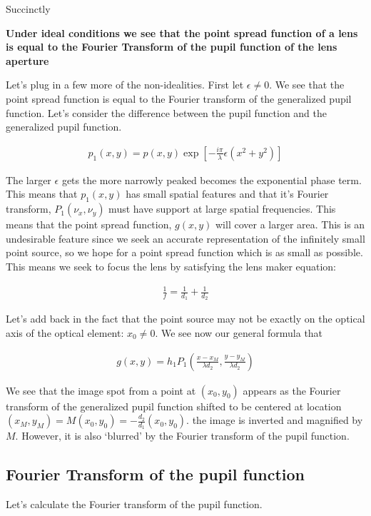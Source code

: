 \documentclass[12pt]{article}
\begin{document}
Succinctly

\textbf{Under ideal conditions we see that the point spread function of a lens is equal to the Fourier Transform of the pupil function of the lens aperture}


Let's plug in a few more of the non-idealities. First let $\epsilon \neq 0$.
We see that the point spread function is equal to the Fourier transform of the generalized pupil function. Let's consider the difference between the pupil function and the generalized pupil function.

\begin{align}
p_1(x,y) = p(x,y) \exp\left[-\frac{i\pi}{\lambda}\epsilon(x^2+y^2)\right]
\end{align}

The larger $\epsilon$ gets the more narrowly peaked becomes the exponential phase term. This means that $p_1(x,y)$ has small spatial features and that it's Fourier transform, $P_1(\nu_x,\nu_y)$ must have support at large spatial frequencies. This means that the point spread function, $g(x,y)$ will cover a larger area. This is an undesirable feature since we seek an accurate representation of the infinitely small point source, so we hope for a point spread function which is as small as possible. This means we seek to focus the lens by satisfying the lens maker equation:

\begin{align}
\frac{1}{f} = \frac{1}{d_1} + \frac{1}{d_2}
\end{align}

Let's add back in the fact that the point source may not be exactly on the optical axis of the optical element: $x_0 \neq 0$. We see now our general formula that

\begin{align}
g(x,y) = h_1 P_1\left(\frac{x-x_M}{\lambda d_2}, \frac{y-y_M}{\lambda d_2}\right)
\end{align}

We see that the image spot from a point at $(x_0,y_0)$ appears as the Fourier transform of the generalized pupil function shifted to be centered at location $(x_M,y_M) = M(x_0,y_0) = -\frac{d_2}{d_1}(x_0,y_0)$. the image is inverted and magnified by $M$. However, it is also `blurred' by the Fourier transform of the pupil function.

\subsection{Fourier Transform of the pupil function}
Let's calculate the Fourier transform of the pupil function.
\end{document}
